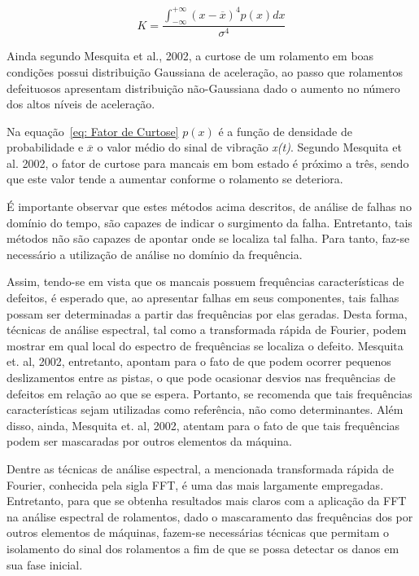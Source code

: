 \documentclass[
	12pt,				
	oneside,			
	a4paper,			
	english,			
	brazil,			
	]{abntex2ppgsi}
\begin{document}
\begin{equation}
	K = \frac{ \int_{-\infty}^{+\infty} (x - \overline{x})^{4}p(x)dx } {\sigma^{4}}
	\label{eq: Fator de Curtose}
\end{equation}

Ainda segundo Mesquita et al., 2002, a curtose de um rolamento em boas condições possui distribuição Gaussiana de aceleração, ao passo que rolamentos defeituosos apresentam distribuição não-Gaussiana dado o aumento no número dos altos níveis de aceleração. 

Na equação~\ref{eq: Fator de Curtose} $p(x)$ é a função de densidade de probabilidade e $\overline{x}$ o valor médio do sinal de vibração \textit{x(t)}. Segundo Mesquita et al. 2002, o fator de curtose para mancais em bom estado é próximo a três, sendo que este valor tende a aumentar conforme o rolamento se deteriora. 

É importante observar que estes métodos acima descritos, de análise de falhas no domínio do tempo, são capazes de indicar o surgimento da falha. Entretanto, tais métodos não são capazes de apontar onde se localiza tal falha. Para tanto, faz-se necessário a utilização de análise no domínio da frequência. 

Assim, tendo-se em vista que os mancais possuem frequências características de defeitos, é esperado que, ao apresentar falhas em seus componentes, tais falhas possam ser determinadas a partir das frequências por elas geradas. Desta forma, técnicas de análise espectral, tal como a transformada rápida de Fourier, podem mostrar em qual local do espectro de frequências se localiza o defeito. Mesquita et. al, 2002, entretanto, apontam para o fato de que podem ocorrer pequenos deslizamentos entre as pistas, o que pode ocasionar desvios nas frequências de defeitos em relação ao que se espera. Portanto, se recomenda que tais frequências características sejam utilizadas como referência, não como determinantes. Além disso, ainda, Mesquita et. al, 2002, atentam para o fato de que tais frequências podem ser mascaradas por outros elementos da máquina.

Dentre as técnicas de análise espectral, a mencionada transformada rápida de Fourier, conhecida pela sigla FFT, é uma das mais largamente empregadas. Entretanto, para que se obtenha resultados mais claros com a aplicação da FFT na análise espectral de rolamentos, dado o mascaramento das frequências dos por outros elementos de máquinas, fazem-se necessárias técnicas que permitam o isolamento do sinal dos rolamentos a fim de que se possa detectar os danos em sua fase inicial. 
\end{document}

